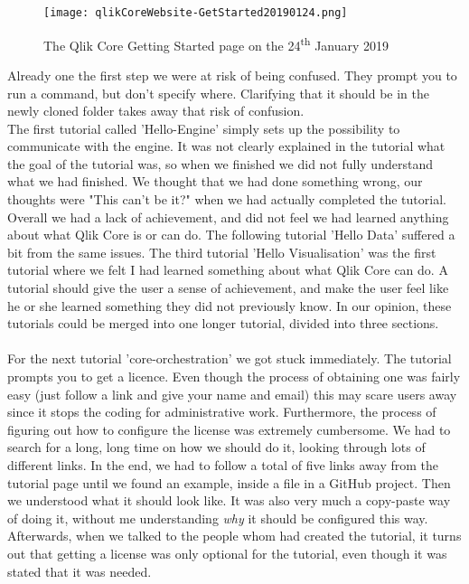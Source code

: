 \documentclass{cslthse-msc}
\begin{document}
    \begin{figure}[H]
        \centering
        \texttt{[image: qlikCoreWebsite-GetStarted20190124.png]}
        \caption{The Qlik Core Getting Started page on the 24\textsuperscript{th} January 2019}
        \label{fig:gettingstarted}
    \end{figure}
    Already one the first step we were at risk of being confused. They prompt you to run a command, but don't specify where. Clarifying that it should be in the newly cloned folder takes away that risk of confusion.\\
    The first tutorial called 'Hello-Engine' simply sets up the possibility to communicate with the engine. It was not clearly explained in the tutorial what the goal of the tutorial was, so when we finished we did not fully understand what we had finished. We thought that we had done something wrong, our thoughts were "This can't be it?" when we had actually completed the tutorial. Overall we had a lack of achievement, and did not feel we had learned anything about what Qlik Core is or can do. The following tutorial 'Hello Data' suffered a bit from the same issues. The third tutorial 'Hello Visualisation' was the first tutorial where we felt I had learned something about what Qlik Core can do. A tutorial should give the user a sense of achievement, and make the user feel like he or she learned something they did not previously know. In our opinion, these tutorials could be merged into one longer tutorial, divided into three sections. \\\\
    For the next tutorial 'core-orchestration' we got stuck immediately. The tutorial prompts you to get a licence. Even though the process of obtaining one was fairly easy (just follow a link and give your name and email) this may scare users away since it stops the coding for administrative work. Furthermore, the process of figuring out how to configure the license was extremely cumbersome. We had to search for a long, long time on how we should do it, looking through lots of different links. In the end, we had to follow a total of five links away from the tutorial page until we found an example, inside a file in a GitHub project. Then we understood what it should look like. It was also very much a copy-paste way of doing it, without me understanding \textit{why} it should be configured this way. Afterwards, when we talked to the people whom had created the tutorial, it turns out that getting a license was only optional for the tutorial, even though it was stated that it was needed.\\\\
\end{document}
